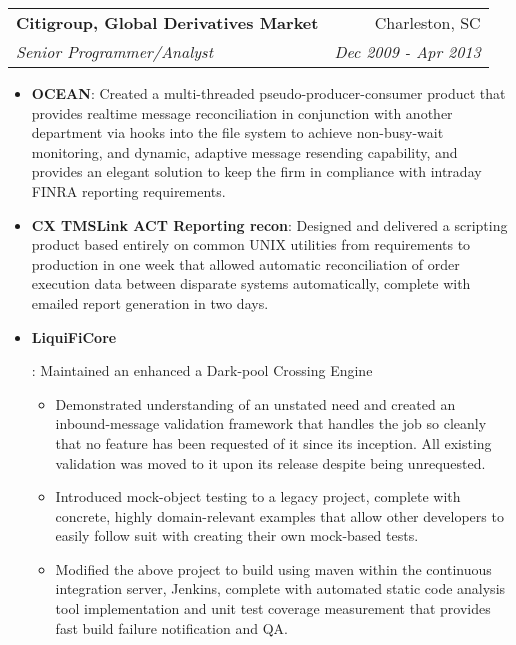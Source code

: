 \documentclass[letterpaper,10pt]{article}
\makeatletter
\newcommand{\resumeItem}[2]{
  \item\small{
    \textbf{#1}{: #2 \vspace{-2pt}}
  }
}
\newcommand{\resumeSubheading}[4]{
  \vspace{-1pt}\item[]
  \begin{tabular*}{0.98\textwidth}{l@{\extracolsep{\fill}}r}
      \hspace{-10pt}\textbf{#1} & #2 \\
      \hspace{-10pt}\textit{\small#3} & \textit{\small #4} \\
    \end{tabular*}\vspace{-5pt}
}
\newcommand{\resumeItemListStart}{\begin{itemize}}
\newcommand{\resumeItemListEnd}{\end{itemize}\vspace{-5pt}}
\makeatother
\begin{document}
    \resumeSubheading
      {Citigroup, Global Derivatives Market}{Charleston, SC}
      {Senior Programmer/Analyst}{Dec 2009 - Apr 2013}
        \resumeItemListStart
          \resumeItem{OCEAN}
            {Created a multi-threaded pseudo-producer-consumer product that provides realtime message reconciliation in conjunction with another department via hooks into the file system to achieve non-busy-wait monitoring, and dynamic, adaptive message resending capability, and provides an elegant solution to keep the firm in compliance with intraday FINRA reporting requirements.}
        \resumeItemListEnd

        \resumeItemListStart
          \resumeItem{CX TMSLink ACT Reporting recon}
            {Designed and delivered a scripting product based entirely on common UNIX utilities from requirements to production in one week that allowed automatic reconciliation of order execution data between disparate systems automatically, complete with emailed report generation in two days.}
        \resumeItemListEnd

        \resumeItemListStart
          \resumeItem{LiquiFiCore}
            {Maintained an enhanced a Dark-pool Crossing Engine
                \begin{itemize}
                    \item Demonstrated understanding of an unstated need and created an inbound-message validation framework that handles the job so cleanly that no feature has been requested of it since its inception. All existing validation was moved to it upon its release despite being unrequested.
                    \item Introduced mock-object testing to a legacy project, complete with concrete, highly domain-relevant examples that allow other developers to easily follow suit with creating their own mock-based tests.
                    \item Modified the above project to build using maven within the continuous integration server, Jenkins, complete with automated static code analysis tool implementation and unit test coverage measurement that provides fast build failure notification and QA.
                \end{itemize}
        }
            \resumeItemListEnd
\end{document}

